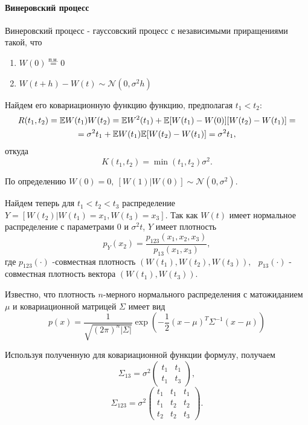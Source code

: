 \documentclass[16pt]{article}
\newcommand\A{(\cdot)}
\begin{document}
\paragraph{Винеровский процесс}
Винеровский процесс - гауссовский процесс с независимыми приращениями такой, что
\begin{enumerate}
	\item $W(0) \overset{\text{п.н.}}{=} 0$
	\item $W(t + h) - W(t) \sim \mathcal{N}(0, \sigma^2h)$
\end{enumerate}

Найдем его ковариационную функцию функцию, предполагая $t_1 < t_2$:
\begin{multline}\notag
 R(t_1, t_2) = \mathbb{E}W(t_1)W(t_2) = \mathbb{E}W^2(t_1) + \mathbb{E}[W(t_1) - W(0)][W(t_2) - W(t_1)] =\\= \sigma^2 t_1 + \mathbb{E}W(t_1)\mathbb{E}[W(t_2) - W(t_1)] = \sigma^2 t_1,
\end{multline}
откуда
$$K(t_1, t_2) = \min(t_1, t_2) \sigma^2.$$

По определению $W(0) = 0, \ [W(1)|W(0)] \sim \mathcal{N}(0, \sigma^2)$. 

Найдем теперь для $t_1 < t_2 < t_3$ распределение $Y = [W(t_2)|W(t_1) = x_1, W(t_3) = x_3]$. 
Так как $W(t)$ имеет нормальное распределение с параметрами $0$ и $\sigma^2t$, $Y$ имеет плотность
$$p_Y(x_2) = \dfrac{p_{123}(x_1, x_2, x_3)}{p_{13}(x_1, x_3)},$$
где $p_{123}\A$ -совместная плотность $(W(t_1), W(t_2), W(t_3)),\ $\ $p_{13}\A$ - совместная плотность вектора $(W(t_1), W(t_3))$.

Известно, что плотность $n$-мерного нормального распределения с матожиданием $\mu$ и ковариационной матрицей $\Sigma$ имеет вид
\begin{equation}
p(x) = \dfrac{1}{\sqrt{(2\pi)^n|\Sigma|}}\exp\left(-\frac{1}{2} (x - \mu)^T\Sigma^{-1} (x - \mu)\right)
\end{equation}

Используя полученную для ковариационной функции формулу, получаем
$$
\Sigma_{13} = \sigma^2 \begin{pmatrix} 
t_1 & t_1 \\
t_1 & t_3
\end{pmatrix},
$$
$$
\Sigma_{123} = \sigma^2 \begin{pmatrix}
t_1 & t_1 & t_1 \\
t_1 & t_2 & t_2 \\
t_2 & t_2 & t_3
\end{pmatrix}.
$$
\end{document}
